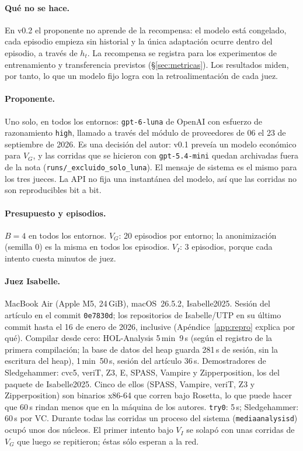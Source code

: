 \documentclass[11pt,a4paper]{article}
\theoremstyle{definition}
\theoremstyle{remark}
\newcommand{\id}[1]{\texttt{\detokenize{#1}}}
\begin{document}
\paragraph{Qué no se hace.} En v0.2 el proponente no aprende de la recompensa: el modelo está congelado, cada episodio empieza sin historial y la única adaptación ocurre dentro del episodio, a través de $h_t$. La recompensa se registra para los experimentos de entrenamiento y transferencia previstos (§\ref{sec:metricas}). Los resultados miden, por tanto, lo que un modelo fijo logra con la retroalimentación de cada juez.

\paragraph{Proponente.} Uno solo, en todos los entornos: \texttt{gpt-6-luna} de OpenAI con esfuerzo de razonamiento \texttt{high}, llamado a través del módulo de proveedores de 06 el 23 de septiembre de 2026. Es una decisión del autor: v0.1 preveía un modelo económico para $V_G$, y las corridas que se hicieron con \texttt{gpt-5.4-mini} quedan archivadas fuera de la nota (\texttt{runs/\_excluido\_solo\_luna}). El mensaje de sistema es el mismo para los tres jueces. La API no fija una instantánea del modelo, así que las corridas no son reproducibles bit a bit.

\paragraph{Presupuesto y episodios.} $B = 4$ en todos los entornos. $V_G$: 20 episodios por entorno; la anonimización (semilla 0) es la misma en todos los episodios. $V_I$: 3 episodios, porque cada intento cuesta minutos de juez.

\paragraph{Juez Isabelle.} MacBook Air (Apple M5, 24\,GiB), macOS~26.5.2, Isabelle2025. Sesión del artículo en el commit \texttt{0e7830d}; los repositorios de Isabelle/UTP en su último commit hasta el 16 de enero de 2026, inclusive (Apéndice~\ref{app:repro} explica por qué). Compilar desde cero: HOL-Analysis 5\,min~9\,s (según el registro de la primera compilación; la base de datos del heap guarda 281\,s de sesión, sin la escritura del heap), \id{ITree_Numeric_VCG} 1\,min~50\,s, sesión del artículo 36\,s. Demostradores de Sledgehammer: cvc5, veriT, Z3, E, SPASS, Vampire y Zipperposition, los del paquete de Isabelle2025. Cinco de ellos (SPASS, Vampire, veriT, Z3 y Zipperposition) son binarios x86-64 que corren bajo Rosetta, lo que puede hacer que 60\,s rindan menos que en la máquina de los autores. \texttt{try0}: 5\,s; Sledgehammer: 60\,s por VC. Durante todas las corridas un proceso del sistema (\texttt{mediaanalysisd}) ocupó unos dos núcleos. El primer intento bajo $V_I$ se solapó con unas corridas de $V_G$ que luego se repitieron; éstas sólo esperan a la red.
\end{document}
